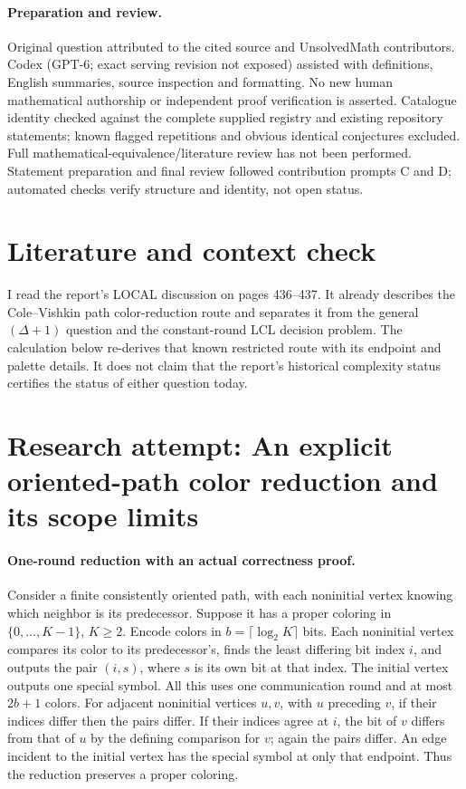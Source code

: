 \documentclass[11pt]{article}
\begin{document}
\paragraph{Preparation and review.}
Original question attributed to the cited source and UnsolvedMath contributors. Codex (GPT-6; exact serving revision not exposed) assisted with definitions, English summaries, source inspection and formatting. No new human mathematical authorship or independent proof verification is asserted. Catalogue identity checked against the complete supplied registry and existing repository statements; known flagged repetitions and obvious identical conjectures excluded. Full mathematical-equivalence/literature review has not been performed. Statement preparation and final review followed contribution prompts C and D; automated checks verify structure and identity, not open status.
\label{end:statement}

\section{Literature and context check}

I read the report's LOCAL discussion on pages 436--437. It already describes
the Cole--Vishkin path color-reduction route and separates it from the general
$(\Delta+1)$ question and the constant-round LCL decision problem.
The calculation below re-derives that known restricted route with its endpoint
and palette details. It does not claim that the report's historical complexity
status certifies the status of either question today.

\section{Research attempt: An explicit oriented-path color reduction and its scope limits}

\paragraph{One-round reduction with an actual correctness proof.}
Consider a finite consistently oriented path, with each noninitial vertex knowing
which neighbor is its predecessor. Suppose it has a proper coloring in
$\{0,\ldots,K-1\}$, $K\geq2$. Encode colors in $b=\lceil\log_2K\rceil$
bits. Each noninitial vertex compares its color to its predecessor's, finds
the least differing bit index $i$, and outputs the pair $(i,s)$, where $s$
is its own bit at that index. The initial vertex outputs one special symbol.
All this uses one communication round and at most $2b+1$ colors.
For adjacent noninitial vertices $u,v$, with $u$ preceding $v$, if their
indices differ then the pairs differ. If their indices agree at $i$, the bit
of $v$ differs from that of $u$ by the defining comparison for $v$; again the
pairs differ. An edge incident to the initial vertex has the special symbol
at only that endpoint. Thus the reduction preserves a proper coloring.
\end{document}
